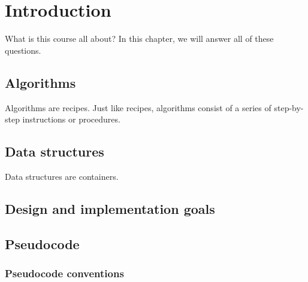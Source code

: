 \chapter{Introduction}

What is this course all about? In this chapter, we will answer all of these questions.

\section{Algorithms}
Algorithms are recipes. Just like recipes, algorithms consist of a series of step-by-step instructions or procedures.

\section{Data structures}
Data structures are containers.

\section{Design and implementation goals}

\section{Pseudocode}

\subsection{Pseudocode conventions}
